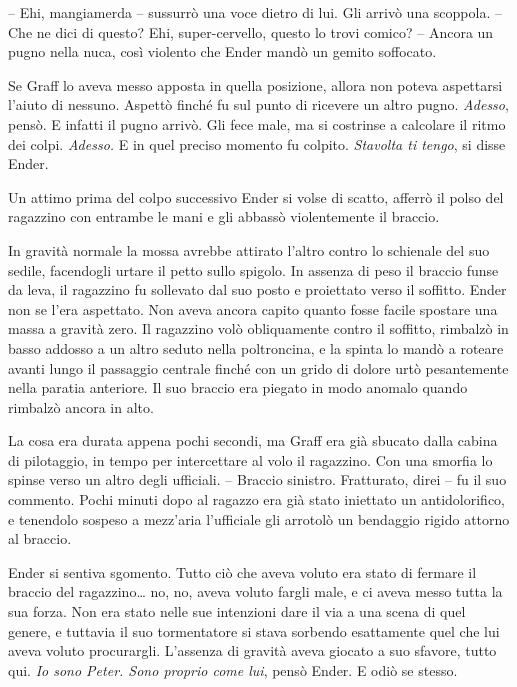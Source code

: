 {-- Ehi, mangiamerda -- sussurrò una voce dietro di lui. Gli arrivò una
	scoppola. -- Che ne dici di questo? Ehi, super-cervello, questo lo trovi
	comico? -- Ancora un pugno nella nuca, così violento che Ender mandò un
	gemito soffocato.}

{Se Graff lo aveva messo apposta in quella posizione, allora non poteva
	aspettarsi l'aiuto di nessuno. Aspettò finché fu sul punto di ricevere
	un altro pugno. \emph{Adesso}, \emph{} pensò. E infatti il pugno arrivò.
	Gli fece male, ma si costrinse a calcolare il ritmo dei colpi.
	\emph{Adesso.} E in quel preciso momento fu colpito. \emph{Stavolta ti
		tengo}, \emph{} si disse Ender.}

{Un attimo prima del colpo successivo Ender si volse di scatto, afferrò
	il polso del ragazzino con entrambe le mani e gli abbassò violentemente
	il braccio.}

{In gravità normale la mossa avrebbe attirato l'altro contro lo
	schienale del suo sedile, facendogli urtare il petto sullo spigolo. In
	assenza di peso il braccio funse da leva, il ragazzino fu sollevato dal
	suo posto e proiettato verso il soffitto. Ender non se l'era aspettato.
	Non aveva ancora capito quanto fosse facile spostare una massa a gravità
	zero. Il ragazzino volò obliquamente contro il soffitto, rimbalzò in
	basso addosso a un altro seduto nella poltroncina, e la spinta lo mandò
	a roteare avanti lungo il passaggio centrale finché con un grido di
	dolore urtò pesantemente nella paratia anteriore. Il suo braccio era
	piegato in modo anomalo quando rimbalzò ancora in alto.}

{La cosa era durata appena pochi secondi, ma Graff era già sbucato dalla
	cabina di pilotaggio, in tempo per intercettare al volo il ragazzino.
	Con una smorfia lo spinse verso un altro degli ufficiali. -- Braccio
	sinistro. Fratturato, direi -- fu il suo commento. Pochi minuti dopo al
	ragazzo era già stato iniettato un antidolorifico, e tenendolo sospeso a
	mezz'aria l'ufficiale gli arrotolò un bendaggio rigido attorno al
	braccio.}

{Ender si sentiva sgomento. Tutto ciò che aveva voluto era stato di
	fermare il braccio del ragazzino\ldots{} no, no, aveva voluto fargli
	male, e ci aveva messo tutta la sua forza. Non era stato nelle sue
	intenzioni dare il via a una scena di quel genere, e tuttavia il suo
	tormentatore si stava sorbendo esattamente quel che lui aveva voluto
	procurargli. L'assenza di gravità aveva giocato a suo sfavore, tutto
	qui. \emph{Io sono Peter. Sono proprio come lui}, \emph{} pensò Ender. E
	odiò se stesso.}


